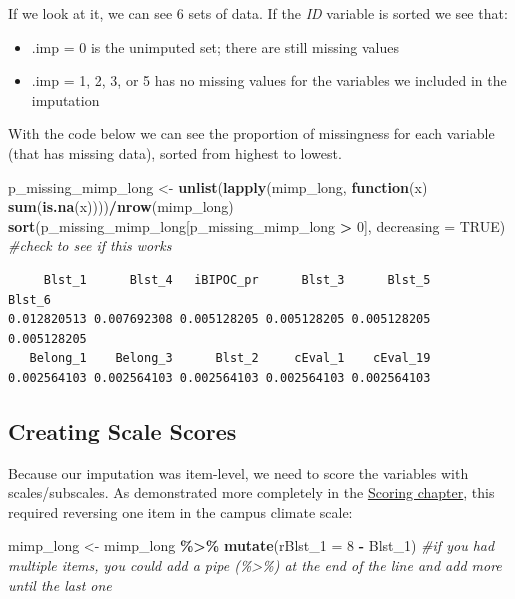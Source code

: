 \documentclass[
  11pt,
]{book}
\newenvironment{Shaded}{\begin{snugshade}}{\end{snugshade}}
\newcommand{\AttributeTok}[1]{\textcolor[rgb]{0.27,0.27,0.27}{#1}}
\newcommand{\CommentTok}[1]{\textcolor[rgb]{0.37,0.37,0.37}{\textit{#1}}}
\newcommand{\ConstantTok}[1]{\textcolor[rgb]{0.37,0.37,0.37}{#1}}
\newcommand{\ControlFlowTok}[1]{\textcolor[rgb]{0.27,0.27,0.27}{\textbf{#1}}}
\newcommand{\DecValTok}[1]{\textcolor[rgb]{0.06,0.06,0.06}{#1}}
\newcommand{\FunctionTok}[1]{\textcolor[rgb]{0.27,0.27,0.27}{\textbf{#1}}}
\newcommand{\NormalTok}[1]{#1}
\newcommand{\OtherTok}[1]{\textcolor[rgb]{0.37,0.37,0.37}{#1}}
\newcommand{\SpecialCharTok}[1]{\textcolor[rgb]{0.43,0.43,0.43}{\textbf{#1}}}
\providecommand{\tightlist}{%
  \setlength{\itemsep}{0pt}\setlength{\parskip}{0pt}}
\begin{document}
If we look at it, we can see 6 sets of data. If the \emph{ID} variable is sorted we see that:

\begin{itemize}
\tightlist
\item
  .imp = 0 is the unimputed set; there are still missing values
\item
  .imp = 1, 2, 3, or 5 has no missing values for the variables we included in the imputation
\end{itemize}

With the code below we can see the proportion of missingness for each variable (that has missing data), sorted from highest to lowest.

\begin{Shaded}
\begin{Highlighting}[]
\NormalTok{p\_missing\_mimp\_long }\OtherTok{\textless{}{-}} \FunctionTok{unlist}\NormalTok{(}\FunctionTok{lapply}\NormalTok{(mimp\_long, }\ControlFlowTok{function}\NormalTok{(x) }\FunctionTok{sum}\NormalTok{(}\FunctionTok{is.na}\NormalTok{(x))))}\SpecialCharTok{/}\FunctionTok{nrow}\NormalTok{(mimp\_long)}
\FunctionTok{sort}\NormalTok{(p\_missing\_mimp\_long[p\_missing\_mimp\_long }\SpecialCharTok{\textgreater{}} \DecValTok{0}\NormalTok{], }\AttributeTok{decreasing =} \ConstantTok{TRUE}\NormalTok{)  }\CommentTok{\#check to see if this works}
\end{Highlighting}
\end{Shaded}

\begin{verbatim}
     Blst_1      Blst_4   iBIPOC_pr      Blst_3      Blst_5      Blst_6 
0.012820513 0.007692308 0.005128205 0.005128205 0.005128205 0.005128205 
   Belong_1    Belong_3      Blst_2     cEval_1    cEval_19 
0.002564103 0.002564103 0.002564103 0.002564103 0.002564103 
\end{verbatim}

\hypertarget{creating-scale-scores}{%
\subsection{Creating Scale Scores}\label{creating-scale-scores}}

Because our imputation was item-level, we need to score the variables with scales/subscales. As demonstrated more completely in the \protect\hyperlink{score}{Scoring chapter}, this required reversing one item in the campus climate scale:

\begin{Shaded}
\begin{Highlighting}[]
\NormalTok{mimp\_long }\OtherTok{\textless{}{-}}\NormalTok{ mimp\_long }\SpecialCharTok{\%\textgreater{}\%}
    \FunctionTok{mutate}\NormalTok{(}\AttributeTok{rBlst\_1 =} \DecValTok{8} \SpecialCharTok{{-}}\NormalTok{ Blst\_1)  }\CommentTok{\#if you had multiple items, you could add a pipe (\%\textgreater{}\%) at the end of the line and add more until the last one}
\end{Highlighting}
\end{Shaded}
\end{document}
